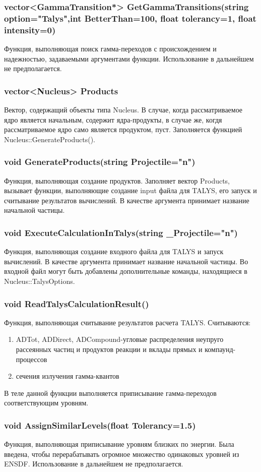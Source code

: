 \documentclass[a4paper,12pt]{extarticle}
\begin{document}
\subsubsection{vector<GammaTransition*> GetGammaTransitions(string option="Talys",int BetterThan=100, float tolerancy=1, float intensity=0)}
Функция, выполняющая поиск гамма-переходов с происхождением и надежностью, задаваемыми аргументами функции. Использование в дальнейшем не предполагается.
\subsubsection{vector<Nucleus> Products}
Вектор, содержащий объекты типа Nucleus. В случае, когда рассматриваемое ядро является начальным, содержит ядра-продукты, в случае же, когдя рассматриваемое ядро само является продуктом, пуст. Заполняется функцией Nucleus::GenerateProducts().
\subsubsection{void GenerateProducts(string Projectile="n")}
Функция, выполняющая создание продуктов. Заполняет вектор Products, вызывает функции, выполняющие создание input файла для TALYS, его запуск и считывание результатов вычислений. В качестве аргумента принимает название начальной частицы.
\subsubsection{void ExecuteCalculationInTalys(string _Projectile="n")}
Функция, выполняющая создание входного файла для TALYS и запуск вычислений. В качестве аргумента принимает название начальной частицы. Во входной файл могут быть добавлены дополнительные команды, находящиеся в Nucleus::TalysOptions.
\subsubsection{void ReadTalysCalculationResult()}
Функция, выполняющая считывание результатов расчета TALYS. Считываются:
\begin{enumerate}
\item ADTot, ADDirect, ADCompound-угловые распределения неупруго рассеянных частиц и продуктов реакции и вклады прямых и компаунд-процессов
\item сечения излучения гамма-квантов
\end{enumerate} 
В теле данной функции выполняется приписывание гамма-переходов соответствующим уровням.
\subsubsection{void AssignSimilarLevels(float Tolerancy=1.5)}
Функция, выполняющая приписывание уровням близких по энергии. Была введена, чтобы перерабатывать огромное множество одинаковых уровней из ENSDF. Использование в дальнейшем не предполагается.
\end{document}
